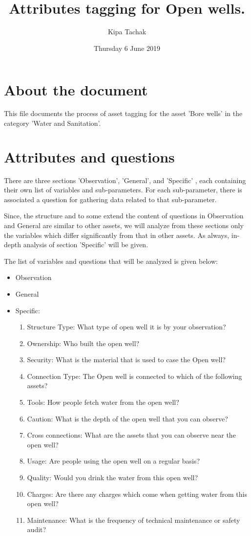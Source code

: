 \documentclass[oneside,twocolumn]{article}
\title{Attributes tagging for Open wells.}
\author{Kipa Tachak}
\date{Thursday  6 June 2019}
\begin{document}
\maketitle

\section{About the document}
This file documents the process of asset tagging for the asset
'Bore wells' in the category 'Water and
Sanitation'.
\section{Attributes and questions}
There are three sections 'Observation', 'General', and 'Specific'
, each containing their own list of variables and sub-parameters.
For each sub-parameter, there is associated a question for
gathering data related to that sub-parameter.

Since, the structure and to some extend the content of questions
in Observation and General are similar to other assets, we will
analyze from these sections only the variables which differ
significantly from that in other assets. As always, in-depth analysis of section 'Specific' will be given.

The list of variables and questions that will be analyzed is given below:
\begin{itemize}
	\item Observation
	\item General
	\item Specific:
	\begin{enumerate}
		\item Structure Type: What type of open well it is by your observation?
		\item Ownership: Who built the open well?
		\item Security: What is the material that is used to case the Open well?
		\item Connection Type: The Open well is connected to which of the following assets?
		\item Tools: How people fetch water from the open well?
		\item Caution: What is the depth of the open well that you can observe?
		\item Cross connections: What are the assets that you can observe near the open well?
		\item Usage: Are people using the open well on a regular basis?
		\item Quality: Would you drink the water from this open well?
		\item Charges: Are there any charges which come when getting water from this open well?
		\item Maintenance: What is the frequency of technical maintenance or safety audit? 
	\end{enumerate}
\end{itemize}
\end{document}
